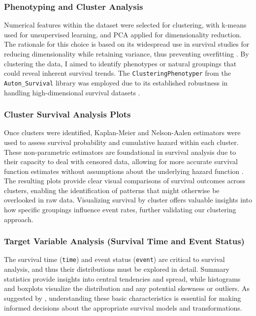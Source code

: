 \subsubsection*{Phenotyping and Cluster Analysis}

Numerical features within the dataset were selected for clustering, with k-means used for unsupervised learning, and PCA applied for dimensionality reduction. The rationale for this choice is based on its widespread use in survival studies for reducing dimensionality while retaining variance, thus preventing overfitting \parencite{polce_guide_2023}. By clustering the data, I aimed to identify phenotypes or natural groupings that could reveal inherent survival trends. The \texttt{ClusteringPhenotyper} from the \texttt{Auton\_Survival} library was employed due to its established robustness in handling high-dimensional survival datasets \parencite{nagpal_auton-survival_2022}. 

\subsubsection*{Cluster Survival Analysis Plots}

Once clusters were identified, Kaplan-Meier and Nelson-Aalen estimators were used to assess survival probability and cumulative hazard within each cluster. These non-parametric estimators are foundational in survival analysis due to their capacity to deal with censored data, allowing for more accurate survival function estimates without assumptions about the underlying hazard function \parencite{ishwaran_random_2008}. The resulting plots provide clear visual comparisons of survival outcomes across clusters, enabling the identification of patterns that might otherwise be overlooked in raw data. Visualizing survival by cluster offers valuable insights into how specific groupings influence event rates, further validating our clustering approach.

\subsubsection*{Target Variable Analysis (Survival Time and Event Status)}

The survival time (\texttt{time}) and event status (\texttt{event}) are critical to survival analysis, and thus their distributions must be explored in detail. Summary statistics provide insights into central tendencies and spread, while histograms and boxplots visualize the distribution and any potential skewness or outliers. As suggested by \parencite{morris_using_2019}, understanding these basic characteristics is essential for making informed decisions about the appropriate survival models and transformations.


